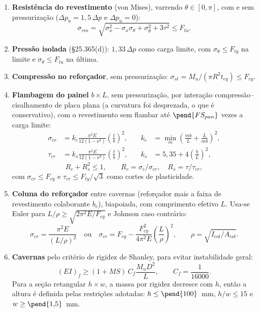 \begin{enumerate}
  \item \textbf{Resistência do revestimento} (von Mises), varrendo $\theta \in [0,\pi]$, com e sem pressurização ($\Delta p_u = 1{,}5\,\Delta p$ e $\Delta p_u = 0$):
  \begin{equation}
    \sigma_{vm} = \sqrt{\sigma_x^2 - \sigma_x\sigma_\theta + \sigma_\theta^2 + 3\tau^2} \leq F_{tu}.
  \end{equation}
  \item \textbf{Pressão isolada} (\S 25.365(d)): $1{,}33\,\Delta p$ como carga limite, com $\sigma_\theta \leq F_{ty}$ na limite e $\sigma_\theta \leq F_{tu}$ na última.
  \item \textbf{Compressão no reforçador}, sem pressurização: $\sigma_{st} = M_u/(\pi R^2 t_{eq}) \leq F_{cy}$.
  \item \textbf{Flambagem do painel} $b \times L$, sem pressurização, por interação compressão--cisalhamento de placa plana (a curvatura foi desprezada, o que é conservativo), com o revestimento sem flambar até $\pend{FS_{pan}}$ vezes a carga limite:
  \begin{equation}
    \begin{aligned}
      \sigma_{cr} &= k_c\frac{\pi^2 E}{12(1-\nu^2)}\left(\frac{t}{b}\right)^2, & \quad k_c &= \min_m\left(\frac{m b}{L} + \frac{L}{m b}\right)^2, \\[1ex]
      \tau_{cr} &= k_s\frac{\pi^2 E}{12(1-\nu^2)}\left(\frac{t}{b}\right)^2, & \quad k_s &= 5{,}35 + 4\left(\frac{b}{L}\right)^2,
    \end{aligned}
  \end{equation}
  \begin{equation}
    R_c + R_s^2 \leq 1, \qquad R_c = \sigma_c/\sigma_{cr}, \quad R_s = \tau/\tau_{cr},
  \end{equation}
  com $\sigma_{cr} \leq F_{cy}$ e $\tau_{cr} \leq F_{ty}/\sqrt{3}$ como cortes de plasticidade.
  
  \item \textbf{Coluna do reforçador} entre cavernas (reforçador mais a faixa de revestimento colaborante $b_e$), biapoiada, com comprimento efetivo $L$. Usa-se Euler para $L/\rho \geq \sqrt{2\pi^2E/F_{cy}}$ e Johnson caso contrário:
  \begin{equation}
    \sigma_{cr} = \frac{\pi^2 E}{(L/\rho)^2}
    \quad\text{ou}\quad
    \sigma_{cr} = F_{cy} - \frac{F_{cy}^2}{4\pi^2 E}\left(\frac{L}{\rho}\right)^2,
    \qquad \rho = \sqrt{I_{col}/A_{col}} .
  \end{equation}
  \item \textbf{Cavernas} pelo critério de rigidez de Shanley, para evitar instabilidade geral:
  \begin{equation}
    (EI)_{f} \geq (1 + MS)\, C_f\frac{M_u D^2}{L}, \qquad C_f = \frac{1}{16000}.
  \end{equation}
  Para a seção retangular $h \times w$, a massa por rigidez decresce com $h$, então a altura é definida pelas restrições adotadas: $h \leq \pend{100}$~mm, $h/w \leq 15$ e $w \geq \pend{1{,}5}$~mm.
\end{enumerate}
 
